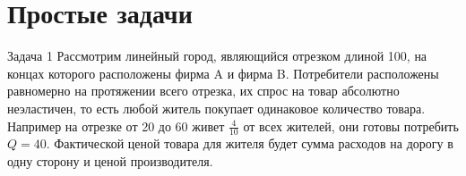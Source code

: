 \section{Простые задачи}
\begin{mybox}{Задача 1}
    \indent\setlength{\parindent}{1em}\indent\setlength{\parindent}{1em}Рассмотрим линейный город, являющийся отрезком длиной 100, на концах которого расположены фирма A и фирма B.
    Потребители
    расположены равномерно на протяжении всего отрезка, их спрос на товар абсолютно неэластичен, то есть любой житель
    покупает одинаковое количество товара. Например на отрезке от 20 до 60 живет $\frac{4}{10}$ от всех жителей,
    они готовы потребить $Q=40$. Фактической ценой товара для жителя будет сумма расходов на дорогу в одну сторону и
    ценой производителя.
    \begin{center}
        \begin{tikzpicture}



\end{tikzpicture}
\end{center}
\end{mybox}
